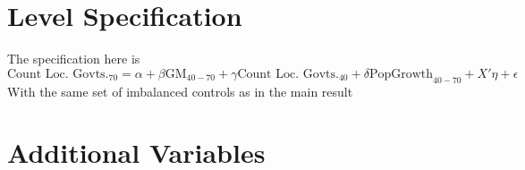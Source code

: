 \documentclass{article}
\begin{document}
\begin{table}[htbp]\centering 
\begin{threeparttable} \caption{Black Pre-trends}

\end{threeparttable}
\end{table}
\clearpage


\begin{table}[htbp]\centering 
\begin{threeparttable} \caption{Literacy Pre-trends}

\end{threeparttable}
\end{table}
\clearpage


\begin{table}[htbp]\centering 
\begin{threeparttable} \caption{In-Labor Force Pre-trends}

\end{threeparttable}
\end{table}
\clearpage


\begin{table}[htbp]\centering 
\begin{threeparttable} \caption{OCCSCORE Pre-trends}

\end{threeparttable}
\end{table}
\clearpage


\section{Level Specification}
The specification here is 
\[
	\text{Count Loc. Govts.}_{70} = \alpha + \beta \text{GM}_{40-70} + \gamma \text{Count Loc. Govts.}_{40} + \delta \text{PopGrowth}_{40-70} + X'\eta + \epsilon
\]
With the same set of imbalanced controls as in the main result
\clearpage
\begin{table}
\footnotesize
\centering
\caption{Main results, Levels}
\begin{threeparttable}
\footnotesize

\end{threeparttable}
\label{tab:main_effect}
\end{table}
\clearpage

\section{Additional Variables}
\begin{landscape}
\begin{table}[htbp]
\footnotesize
\centering {}  
\caption{Municipalities Incorporated between 1940 and 1970: Additional variables}\label{tab:touching_pct_rev_debt}
\begin{threeparttable}
\scriptsize 
    

    \end{threeparttable}
    \end{table}
\end{landscape}
\end{document}
